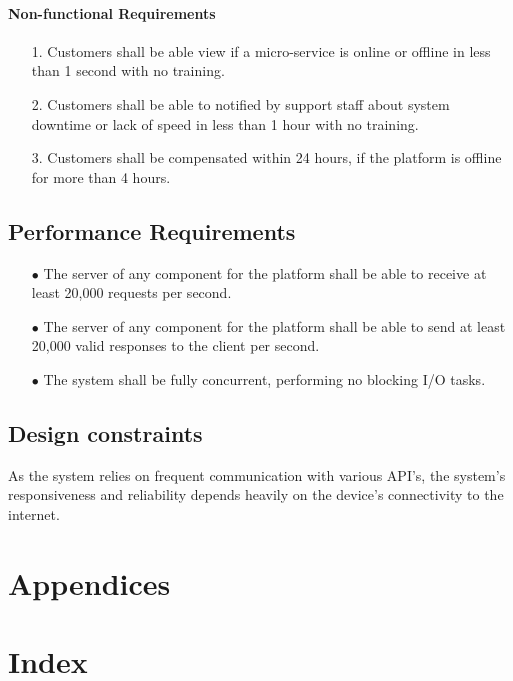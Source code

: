 \documentclass{scrreprt}
\begin{document}
\subsubsection{Non-functional Requirements}
\begin{enumerate}
	\item[1.] Customers shall be able view if a micro-service is online or offline in less than 1 second with no training.
	\item[2.] Customers shall be able to notified by support staff about system downtime or lack of speed in less than 1 hour with no training.
	\item[3.] Customers shall be compensated within 24 hours, if the platform is offline for more than 4 hours.
\end{enumerate}


\section{Performance Requirements}
\begin{enumerate}
	\item[$\bullet$] The server of any component for the platform shall be able to receive at least 20,000 requests per second.
	\item[$\bullet$] The server of any component for the platform shall be able to send at least 20,000 valid responses to the client per second.
	\item[$\bullet$] The system shall be fully concurrent, performing no blocking I/O tasks.
\end{enumerate}


\section{Design constraints}
As the system relies on frequent communication with various API's, the system's responsiveness and reliability depends heavily on the device's connectivity to the internet.

\chapter{Appendices}
\chapter{Index}
\end{document}
